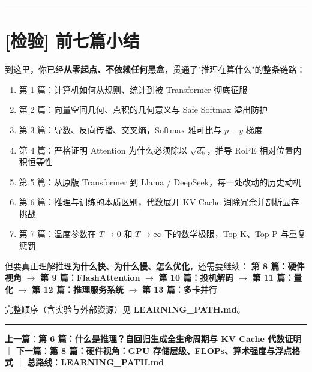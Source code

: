 \vspace{0.8em}\hrule\vspace{0.8em}

\section{[检验] 前七篇小结}

到这里，你已经\textbf{从零起点、不依赖任何黑盒}，贯通了"推理在算什么"的整条链路：

\begin{enumerate}
  \item 第 1 篇：计算机如何从规则、统计到被 Transformer 彻底征服
  \item 第 2 篇：向量空间几何、点积的几何意义与 Safe Softmax 溢出防护
  \item 第 3 篇：导数、反向传播、交叉熵，Softmax 雅可比与 $p - y$ 梯度
  \item 第 4 篇：严格证明 Attention 为什么必须除以 $\sqrt{d_k}$，推导 RoPE 相对位置内积恒等性
  \item 第 5 篇：从原版 Transformer 到 Llama / DeepSeek，每一处改动的历史动机
  \item 第 6 篇：推理与训练的本质区别，代数展开 KV Cache 消除冗余并剖析显存挑战
  \item 第 7 篇：温度参数在 $T \to 0$ 和 $T \to \infty$ 下的数学极限，Top-K、Top-P 与重复惩罚
\end{enumerate}

但要真正理解推理\textbf{为什么快、为什么慢、怎么优化}，还需要继续：
{}\textbf{第 8 篇：硬件视角} $\rightarrow$ \textbf{第 9 篇：FlashAttention} $\rightarrow$ \textbf{第 10 篇：投机解码} $\rightarrow$ \textbf{第 11 篇：量化} $\rightarrow$ \textbf{第 12 篇：推理服务系统} $\rightarrow$ \textbf{第 13 篇：多卡并行}

完整顺序（含实验与外部资源）见 \textbf{LEARNING\_PATH.md}。

\vspace{0.8em}\hrule\vspace{0.8em}

\textbf{上一篇}：\textbf{第 6 篇：什么是推理？自回归生成全生命周期与 KV Cache 代数证明} ｜ \textbf{下一篇}：\textbf{第 8 篇：硬件视角：GPU 存储层级、FLOPs、算术强度与浮点格式} ｜ \textbf{总路线}：\textbf{LEARNING\_PATH.md}
